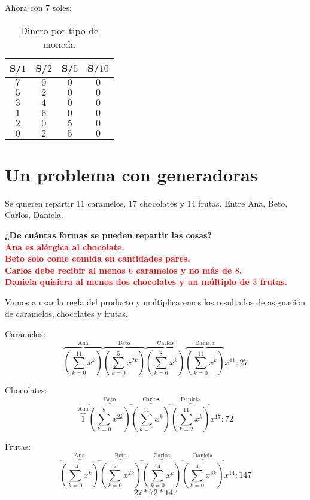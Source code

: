 \documentclass[../main.tex]{subfiles}
\begin{document}
Ahora con 7 soles:
\begin{table}[H]
	\centering
	\begin{tabular}{|c|c|c|c|}
		S/$1$ & S/$2$ & S/$5$ & S/$10$\\
		\hline
		$7$ & $0$ & $0$ & $0$\\
		$5$ & $2$ & $0$ & $0$\\
		$3$ & $4$ & $0$ & $0$\\
		$1$ & $6$ & $0$ & $0$\\
		$2$ & $0$ & $5$ & $0$\\
		$0$ & $2$ & $5$ & $0$\\
		\hline
	\end{tabular}
	\caption{Dinero por tipo de moneda}
\end{table}

\section{Un problema con generadoras}%
\label{sec:un_problema_con_generadoras}

Se quieren repartir $11$ caramelos, $17$ chocolates y $14$ frutas.
Entre Ana, Beto, Carlos, Daniela.

\textbf{¿De cuántas formas se pueden repartir las cosas?}
\textcolor{red}
{
	\bfseries\boldmath\noindent\\
	Ana es alérgica al chocolate.\\
	Beto solo come comida en cantidades pares.\\
	Carlos debe recibir al menos $6$ caramelos y no más de $8$.\\
	Daniela quisiera al menos dos chocolates y un múltiplo de $3$ frutas.
}

Vamos a usar la regla del producto y multiplicaremos los resultados de
asignación de caramelos, chocolates y frutas.

Caramelos:
\[
	\overbrace
	{
		\left(
			\sum_{k=0}^{11}
			x^k
		\right)
	}^
	{
		\text{Ana}
	}
	\overbrace
	{
		\left(
			\sum_{k=0}^{5}
			x^{2k}
		\right)
	}^
	{
		\text{Beto}
	}
	\overbrace
	{
		\left(
			\sum_{k=6}^{8}
			x^k
		\right)
	}^
	{
		\text{Carlos}
	}
	\overbrace
	{
		\left(
			\sum_{k=0}^{11}
			x^k
		\right)
	}^
	{
		\text{Daniela}
	}
	x^{11}:27
\]

Chocolates:
\[
	\overbrace
	{
		1
	}^
	{
		\text{Ana}
	}
	\overbrace
	{
		\left(
			\sum_{k=0}^{8}
			x^{2k}
		\right)
	}^
	{
		\text{Beto}
	}
	\overbrace
	{
		\left(
			\sum_{k=0}^{11}
			x^k
		\right)
	}^
	{
		\text{Carlos}
	}
	\overbrace
	{
		\left(
			\sum_{k=2}^{11}
			x^k
		\right)
	}^
	{
		\text{Daniela}
	}
	x^{17}:72
\]

Frutas:
\[
	\overbrace
	{
		\left(
			\sum_{k=0}^{14}
			x^k
		\right)
	}^
	{
		\text{Ana}
	}
	\overbrace
	{
		\left(
			\sum_{k=0}^{7}
			x^{2k}
		\right)
	}^
	{
		\text{Beto}
	}
	\overbrace
	{
		\left(
			\sum_{k=0}^{14}
			x^k
		\right)
	}^
	{
		\text{Carlos}
	}
	\overbrace
	{
		\left(
			\sum_{k=0}^{4}
			x^{3k}
		\right)
	}^
	{
		\text{Daniela}
	}
	x^{14}:147
\]
\[
	\boxed
	{
		27*72*147
	}
\]
\end{document}
